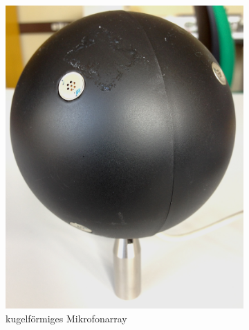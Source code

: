 \begin{figure}
        \centering
        \begin{subfigure}[b]{0.435\textwidth}
                \centering
                \includegraphics[width=\textwidth]{grafiken/01_Einfuehrung/Foto_MikrofonArray}
                \caption{kugelförmiges Mikrofonarray}
                \label{fig:Foto_MikrofonArray}
        \end{subfigure}
        ~ %
        \begin{subfigure}[b]{0.48\textwidth}
                \centering

\end{subfigure}
\end{figure}
